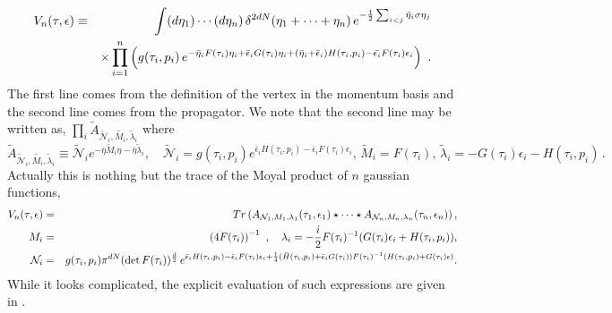 \documentclass[a4paper,11pt]{article}
\begin{document}
\begin{eqnarray}
V_{n}(\tau ,\epsilon ) &\equiv &\int (d\eta _{1})\cdots (d\eta
_{n})\,\delta^{2dN}(\eta _{1}+\cdots +\eta _{n})\,e^{-\frac{1}{2}\sum_{i<j}%
\bar{\eta}_{i}\sigma \eta _{j}}  \notag \\
&&\times \prod_{i=1}^{n}\left( g(\tau _{i},p_{i})\,e^{-\bar{\eta}_{i}F(\tau
_{i})\eta _{i}+\bar{\epsilon}_{i}G(\tau _{i})\eta _{i}+(\bar{\eta}_{i}+\bar{%
\epsilon}_{i})H(\tau _{i},p_i)-\bar{\epsilon _{i}}F(\tau _{i})\epsilon
_{i}}\right) \,\,.
\end{eqnarray}%
The first line comes from the definition of the vertex in the momentum basis
and the second line comes from the propagator. We note that the second line
may be written as, $\prod_{i}\tilde{A}_{\tilde{\mathcal{N}}_i,\tilde{M_{i}},%
\tilde{\lambda}_{i}}$ where
\begin{equation}
\tilde{A}_{\tilde{\mathcal{N}}_i,\tilde{M_{i}},\tilde{\lambda}_{i}}\equiv
\tilde{\mathcal{N}}_i e^{-\bar{\eta} \tilde{M}_i\eta -\bar{\eta}\tilde{\lambda}_i },\quad
\tilde{\mathcal{N}}_{i}=g(\tau _{i},p_{i})e^{\bar{\epsilon}_{i}H(\tau
_{i},p_i)-\bar{\epsilon}_{i}F(\tau _{i})\epsilon _{i}},\,\tilde{M}%
_{i}=F(\tau _{i}),\,\tilde{\lambda}_{i}=-G(\tau _{i})\epsilon _{i}-H(\tau
_{i},p_i)\,.
\end{equation}%
Actually this is nothing but the trace of the Moyal product of $n$ gaussian
functions,
\begin{eqnarray}
V_{n}(\tau ,\epsilon ) &=&Tr\left( A_{\mathcal{N}_{1},M_{1},\lambda
_{1}}(\tau _{1},\epsilon _{1})\star \cdots \star A_{\mathcal{N}%
_{n},M_{n},\lambda _{n}}(\tau _{n},\epsilon _{n})\right) , \\
M_{i} &=&\left(4F(\tau _{i})\right)^{-1}\,\,,\quad \lambda _{i}=-\frac{i}{2}%
F(\tau_{i})^{-1}(G(\tau _{i})\epsilon _{i}+H(\tau _{i},p_i)) , \\
\mathcal{N}_{i} &=&g(\tau _{i},p_{i})\pi^{dN}(\det F(\tau _{i}))^{\frac{d}{2}%
}\,e^{\bar{\epsilon}_{i}H(\tau _{i},p_i)-\bar{\epsilon}_{i}F(\tau
_{i})\epsilon _{i}+\frac{1}{4}(\bar{H}(\tau _{i},p_i)+\bar{\epsilon}%
_{i}G(\tau _{i}))F(\tau _{i})^{-1}(H(\tau _{i},p_i)+G(\tau _{i})\epsilon )}.
\notag
\end{eqnarray}%
While it looks complicated, the explicit evaluation of such expressions are
given in \cite{BM2}.
\end{document}
